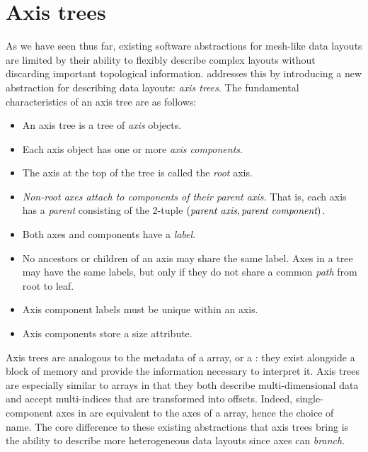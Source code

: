 \documentclass[thesis]{subfiles}
\begin{document}
\chapter{Axis trees}
\label{chapter:axis_trees}

As we have seen thus far, existing software abstractions for mesh-like data layouts are limited by their ability to flexibly describe complex layouts without discarding important topological information.
 addresses this by introducing a new abstraction for describing data layouts: \emph{axis trees}.
The fundamental characteristics of an axis tree are as follows:

\begin{itemize}
  \item
    An axis tree is a tree of \emph{axis} objects.

  \item
    Each axis object has one or more \emph{axis components}.

  \item
    The axis at the top of the tree is called the \emph{root} axis.

  \item
    \emph{Non-root axes attach to components of their parent axis.}
    That is, each axis has a \emph{parent} consisting of the 2-tuple $(\textnormal{\it parent axis}, \textnormal{\it parent component})$.

  \item
    Both axes and components have a \emph{label}.

  \item
    No ancestors or children of an axis may share the same label.
    Axes in a tree may have the same labels, but only if they do not share a common \emph{path} from root to leaf.

  \item
    Axis component labels must be unique within an axis.

  \item
    Axis components store a size attribute.
\end{itemize}

Axis trees are analogous to the metadata of a \numpy array, or a  : they exist alongside a block of memory and provide the information necessary to interpret it.
Axis trees are especially similar to \numpy arrays in that they both describe multi-dimensional data and accept multi-indices that are transformed into offsets.
Indeed, single-component axes in  are equivalent to the axes of a \numpy array, hence the choice of name.
The core difference to these existing abstractions that axis trees bring is the ability to describe more heterogeneous data layouts since axes can \emph{branch}.
\end{document}
